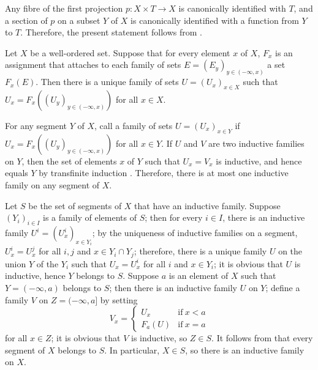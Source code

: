 \documentclass{article}
\begin{document}
Any fibre of the first projection \(p : X \times T \to X\) is
canonically identified with \(T\), and a section of \(p\) on a subset
\(Y\) of \(X\) is canonically identified with a function from \(Y\) to
\(T\).  Therefore, the present statement follows from
.

\begin{theorem}
  \label{thm:4axgzui8}
  Let \(X\) be a well-ordered set.  Suppose that for every element
  \(x\) of \(X\), \(F_x\) is an assignment that attaches to each
  family of sets \(E = (E_y)_{y \in (-\infty, x)}\) a set \(F_x(E)\).
  Then there is a unique family of sets \(U = (U_x)_{x \in X}\) such
  that \(U_x = F_x((U_y)_{y \in (-\infty, x)})\) for all \(x \in X\).
\end{theorem}

For any segment \(Y\) of \(X\), call a family of sets
\(U = (U_x)_{x \in Y}\)  if
\(U_x = F_x((U_y)_{y \in (-\infty, x)})\) for all \(x \in Y\).  If
\(U\) and \(V\) are two inductive families on \(Y\), then the set of
elements \(x\) of \(Y\) such that \(U_x = V_x\) is inductive, and
hence equals \(Y\) by transfinite induction .
Therefore, there is at most one inductive family on any segment of
\(X\).

Let \(S\) be the set of segments of \(X\) that have an inductive
family.  Suppose \((Y_i)_{i \in I}\) is a family of elements of \(S\);
then for every \(i \in I\), there is an inductive family
\(U^i = (U^i_x)_{x \in Y_i}\); by the uniqueness of inductive families
on a segment, \(U^i_x = U^j_x\) for all \(i, j\) and
\(x \in Y_i \cap Y_j\); therefore, there is a unique family \(U\) on
the union \(Y\) of the \(Y_i\) such that \(U_x = U^i_x\) for all \(i\)
and \(x \in Y_i\); it is obvious that \(U\) is inductive, hence \(Y\)
belongs to \(S\).  Suppose \(a\) is an element of \(X\) such that
\(Y = (-\infty, a)\) belongs to \(S\); then there is an inductive
family \(U\) on \(Y\); define a family \(V\) on \(Z = (-\infty, a]\)
by setting
\begin{displaymath}
  V_x =
  \begin{cases}
    U_x
    & \text{if} ~ x < a \\
    F_a(U)
    & \text{if} ~ x = a
  \end{cases}
\end{displaymath}
for all \(x \in Z\); it is obvious that \(V\) is inductive, so
\(Z \in S\).  It follows from  that every segment
of \(X\) belongs to \(S\).  In particular, \(X \in S\), so there is an
inductive family on \(X\).
\end{document}

